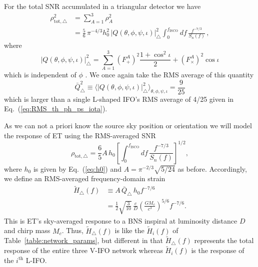 \documentclass[prd,amsmath,amssymb,aps,floats,amsfonts,notitlepage,superscriptaddress,eqsecnum,nofootinbib,10pt]{revtex4-1}
\newcommand{\nn}{\nonumber}
\newcommand{\f}{\frac}
\newcommand{\be}{\begin{equation}}
\newcommand{\ee}{\end{equation}}
\begin{document}
For the total SNR accumulated in a triangular detector we have
%
\begin{align}
\rho^2_{\text{tot},\bigtriangleup} & = \sum_{A=1}^3 \rho_A^2 \nn \\ %
 & =  \f{5}{6}\, \pi^{-4/3} h_0^2\,|Q(\theta,\phi,\psi,\iota)|_\bigtriangleup^2 \int_0^{f_\text{ISCO}} d f\, \f{f^{-7/3}}{S_n(f)} \, ,\label{eq:ET_SNRsq}
\end{align}
where
%
\be
|Q(\theta,\phi,\psi,\iota)|_\bigtriangleup^2 = \sum_{A=1}^3 \left(F^A_+\right)^2\f{1+\cos^2\iota}{2}  + \left(F^A_\times\right)^2 \cos\iota \label{eq:Q_sq_ET}
\ee
%
which is independent of $\phi$ \cite{Regimbau:2012ir}. We once again take the RMS average of this quantity
%
\be
\bar{Q}^2_\bigtriangleup\equiv\langle |Q(\theta,\phi,\psi,\iota)|_\bigtriangleup^2 \rangle_{\theta,\phi,\psi,\iota} = \f{9}{25}\label{eq:RMS_ET}
\ee
%
which is larger than a single L-shaped IFO's RMS average of 4/25 given in Eq.~(\ref{eq:RMS_th_ph_ps_iota}).

As we can not a priori know the source sky position or orientation we will model the response of ET using the RMS-averaged SNR %
%
\be
\rho_{\text{tot},\bigtriangleup} = \f{6}{5}A\, h_0 \left[\int_0^{f_\text{ISCO}} d f\, \f{f^{-7/3}}{S_n(f)}\right]^{1/2} \label{eq:ET_SNR},
\ee
where $h_0$ is given by Eq.~(\ref{eq:h0}) and $A=\pi^{-2/3}\sqrt{5/24}$ as before. %
Accordingly, we define an RMS-averaged frequency-domain strain
%
\begin{align}
\tilde{H}_\bigtriangleup(f)&\equiv A\,  \bar{Q}_\bigtriangleup\, h_0 f^{-7/6} \nn \\
   & = \f{1}{2}\sqrt{\f{3}{10}}\, \f{c}{D}\left(\f{G M_c}{c^3}\right)^{5/6} f^{-7/6}. \label{eq:H_delta}
\end{align}
%
This is ET's sky-averaged response to a BNS inspiral at luminosity distance $D$ and chirp mass $M_c$.
Thus, $\tilde{H}_\bigtriangleup(f)$ is like the $\tilde{H}_i(f)$ of Table~\ref{table:network_params},
but different in that  $\tilde{H}_\bigtriangleup(f)$ represents the total response of the entire three V-IFO network whereas $\tilde{H}_i(f)$
is the response of the $i^\text{th}$ L-IFO.
\end{document}
